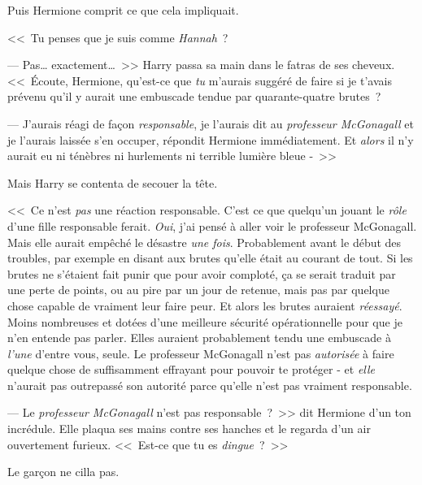Puis Hermione comprit ce que cela impliquait.

<<~Tu penses que je suis comme \emph{Hannah}~?

--- Pas… exactement…~>> Harry passa sa main dans le fatras de ses cheveux. <<~Écoute, Hermione, qu'est-ce que \emph{tu} m'aurais suggéré de faire si je t'avais prévenu qu'il y aurait une embuscade tendue par quarante-quatre brutes~?

--- J'aurais réagi de façon \emph{responsable}, je l'aurais dit au \emph{professeur McGonagall} et je l'aurais laissée s'en occuper, répondit Hermione immédiatement. Et \emph{alors} il n'y aurait eu ni ténèbres ni hurlements ni terrible lumière bleue -~>>

Mais Harry se contenta de secouer la tête.

<<~Ce n'est \emph{pas} une réaction responsable. C'est ce que quelqu'un jouant le \emph{rôle} d'une fille responsable ferait. \emph{Oui}, j'ai pensé à aller voir le professeur McGonagall. Mais elle aurait empêché le désastre \emph{une fois}. Probablement avant le début des troubles, par exemple en disant aux brutes qu'elle était au courant de tout. Si les brutes ne s'étaient fait punir que pour avoir comploté, ça se serait traduit par une perte de points, ou au pire par un jour de retenue, mais pas par quelque chose capable de vraiment leur faire peur. Et alors les brutes auraient \emph{réessayé}. Moins nombreuses et dotées d'une meilleure sécurité opérationnelle pour que je n'en entende pas parler. Elles auraient probablement tendu une embuscade à \emph{l'une} d'entre vous, seule. Le professeur McGonagall n'est pas \emph{autorisée} à faire quelque chose de suffisamment effrayant pour pouvoir te protéger - et \emph{elle} n'aurait pas outrepassé son autorité parce qu'elle n'est pas vraiment responsable.

--- Le \emph{professeur McGonagall} n'est pas responsable~?~>> dit Hermione d'un ton incrédule. Elle plaqua ses mains contre ses hanches et le regarda d'un air ouvertement furieux. <<~Est-ce que tu es \emph{dingue}~?~>>

Le garçon ne cilla pas.

